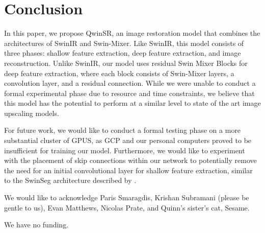 \documentclass{article}
\begin{document}
\section{Conclusion}

In this paper, we propose QwinSR, an image restoration model that combines the architectures of SwinIR and Swin-Mixer. Like SwinIR, this model consists of three phases: shallow feature extraction, deep feature extraction, and image reconstruction. Unlike SwinIR, our model uses residual Swin Mixer Blocks for deep feature extraction, where each block consists of Swin-Mixer layers, a convolution layer, and a residual connection. While we were unable to conduct a formal experimental phase due to resource and time constraints, we believe that this model has the potential to perform at a similar level to state of the art image upscaling models.

For future work, we would like to conduct a formal testing phase on a more substantial cluster of GPUS, as GCP and our personal computers proved to be insufficient for training our model. Furthermore, we would like to experiment with the placement of skip connections within our network to potentially remove the need for an initial convolutional layer for shallow feature extraction, similar to the SwinSeg architecture described by \citet{SwinSeg}.


\begin{ack}
    We would like to acknowledge Paris Smaragdis, Krishan Subramani (please be gentle to us), Evan Matthews, Nicolas Prate, and Quinn’s sister’s cat, Sesame.

    We have no funding.
\end{ack}


\end{document}
